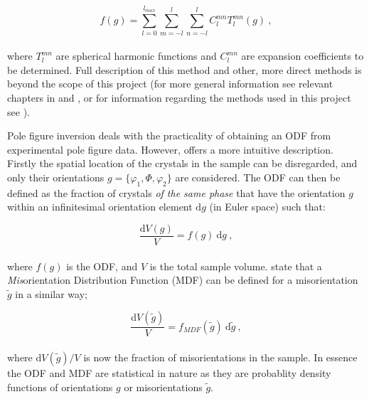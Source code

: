 \documentclass[a4paper,12pt,twoside]{report}
\numberwithin{equation}{chapter}
\begin{document}
\begin{equation} \label{eq:series_exp}
f(g) = \sum_{l=0}^{l_{max}} \sum_{m=-l}^l \sum_{n=-l}^l C_l^{mn} T_l^{mn} (g) \ ,
\end{equation}
\\
where $T_l^{mn}$ are spherical harmonic functions and $C_l^{mn}$ are expansion coefficients to be determined. Full description of this method and other, more direct methods is beyond the scope of this project (for more general information see relevant chapters in \cite{bunge1982texture,Bunge1985} and \cite{Randle2000}, or for information regarding the methods used in this project see \cite{Hielscher2008}).




Pole figure inversion deals with the practicality of obtaining an ODF from experimental pole figure data. However, \cite{bunge1982texture} offers a more intuitive description. Firstly the spatial location of the crystals in the sample can be disregarded, and only their orientations $g = \{\varphi_1,\Phi,\varphi_2\}$ are considered. The ODF can then be defined as the fraction of crystals \emph{of the same phase} that have the orientation $g$ within an infinitesimal orientation element $\mathrm{d}g$ (in Euler space) such that: 



\begin{equation}
\frac{\mathrm{d}V(g)}{V} = f(g)\ \mathrm{d}g\ ,
\end{equation}
\\
where $f(g)$ is the ODF, and $V$ is the total sample volume. \cite{Mainprice} state that a \emph{Mis}orientation Distribution Function (MDF) can be defined for a misorientation $\tilde{g}$ in a similar way;




\begin{equation}
\frac{\mathrm{d}V(\tilde{g})}{V} = f_{MDF}(\tilde{g})\ \mathrm{d}\tilde{g}\ ,
\end{equation}
\\
where $\mathrm{d}V(\tilde{g})/V$ is now the fraction of misorientations in the sample. In essence the ODF and MDF are statistical in nature as they are probablity density functions of orientations $g$ or misorientations $\tilde{g}$. 
\end{document}
